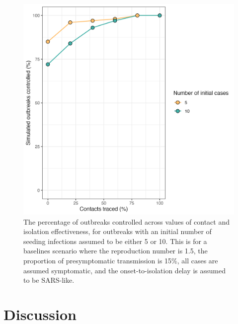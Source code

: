\documentclass{article}
\begin{document}
\begin{figure}[ht]
\centering
\includegraphics[width=\textwidth]{../plots/prop_outbreak_control_num_init_cases.png}
\caption{The percentage of outbreaks controlled across values of contact and isolation effectiveness, for outbreaks with an initial number of seeding infections assumed to be either 5 or 10. This is for a baselines scenario where the reproduction number is 1.5, the proportion of presymptomatic transmission is 15\%, all cases are assumed symptomatic, and the onset-to-isolation delay is assumed to be SARS-like.}
\label{fig:prop-outbreak-control-num-init-cases}
\end{figure}

\section*{Discussion}
\end{document}
